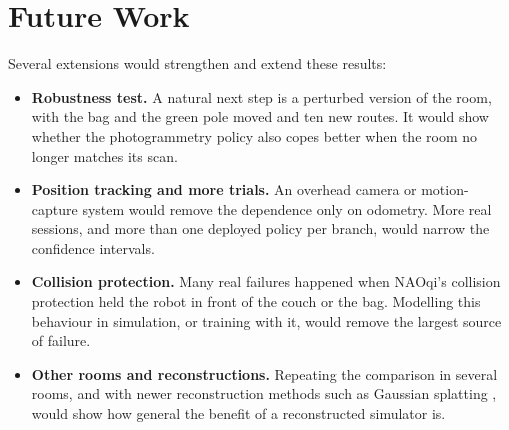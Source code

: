 \section{Future Work}\label{sec:future}
Several extensions would strengthen and extend these results:
\begin{itemize}
\item \textbf{Robustness test.} A natural next step is a perturbed version of the room, with the bag
and the green pole moved and ten new routes. It would show whether the photogrammetry policy also
copes better when the room no longer matches its scan.
\item \textbf{Position tracking and more trials.} An overhead camera or motion-capture system would
remove the dependence only on odometry. More real sessions, and more than one deployed policy per
branch, would narrow the confidence intervals.
\item \textbf{Collision protection.} Many real failures happened when NAOqi's collision protection
held the robot in front of the couch or the bag. Modelling this behaviour in simulation, or training
with it, would remove the largest source of failure.
\item \textbf{Other rooms and reconstructions.} Repeating the comparison in several rooms, and with
newer reconstruction methods such as Gaussian splatting \cite{chhablani2025embodiedsplat}, would
show how general the benefit of a reconstructed simulator is.
\end{itemize}
